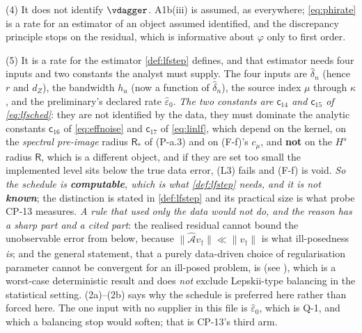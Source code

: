 \begin{remark}
(4) It does not identify $\vdagger$. A1b(iii) is assumed, as everywhere; \eqref{eq:phirate} is a
rate for an estimator of an object assumed identified, and the discrepancy principle stops on the
residual, which is informative about $\varphi$ only to first order.

(5) It is a rate for the estimator \cref{def:lfstep} defines, and that estimator needs four
inputs and two constants the analyst must supply. The four inputs are $\hat\delta_n$ (hence $r$ and
$d_Z$), the bandwidth $h_u$ (now a function of $\hat\delta_n$), the source index $\mu$ through
$\kappa$, and the preliminary's declared rate $\hat\varepsilon_0$. \emph{The two constants are
$\mathsf c_{14}$ and $\mathsf c_{15}$ of \eqref{eq:lfsched}}: they are not identified by the data, they
must dominate the analytic constants $\mathsf c_{16}$
of \eqref{eq:effnoise} and $\mathsf c_{17}$ of \eqref{eq:linlf}, which depend on the kernel, on the
\emph{spectral pre-image} radius $\mathsf R_\ast$ of (P-a.3) and on (F-f)'s $c_\mu$, and \textbf{not} on
the $H^{s}$ radius $\mathsf R$, which is a different object, and if they are set too small the implemented
level sits below the true data error, (L3) fails and (F-f) is void. \emph{So the schedule is
\textbf{computable}, which is what \cref{def:lfstep} needs, and it is not \textbf{known}}; the
distinction is stated in \cref{def:lfstep} and its practical size is what probe CP-13 measures.
\emph{A rule that used only the data would not do, and the reason has a sharp part and a cited part}:
the realised residual cannot bound the unobservable error from below, because
$\|\hat{\mathcal A}v_\dagger\|\ll\|v_\dagger\|$ is what ill-posedness \emph{is}; and the general
statement, that a purely data-driven choice of regularisation parameter cannot be convergent for an
ill-posed problem, is \citet{bakushinskii1984} (see \citet[\S3.3]{engl2000}), which is a worst-case
deterministic result and does \emph{not} exclude Lepskii-type balancing in the statistical setting.
(2a)--(2b) says why the schedule is preferred here rather than forced here. The one
input with no supplier in this file is $\hat\varepsilon_0$, which is Q-1, and which a balancing stop
would soften; that is CP-13's third arm.


\end{remark}
